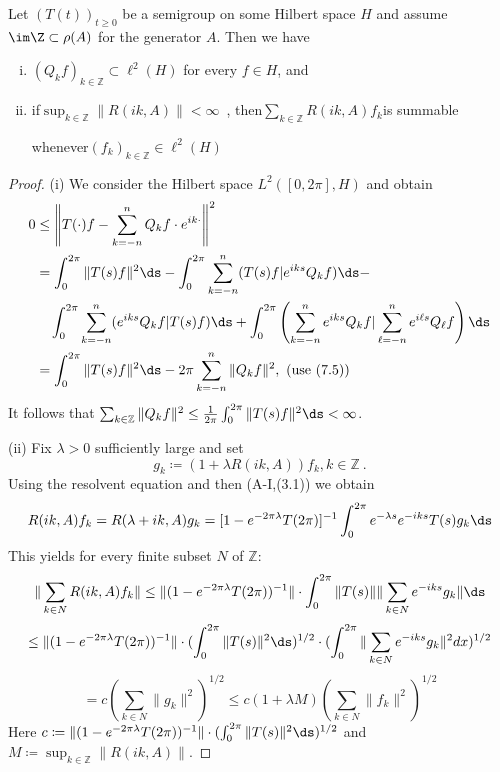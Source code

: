 \begin{lemma}\label{lem:a3-7.9}
Let $(T(t))_{t\geq 0}$ be a semigroup on some Hilbert space $H$ and assume $\im\Z \subset \rho(A)$ for the generator $A$.
Then we have



\begin{enumerate}[(i)]
\item 
$(Q_{k}f)_{k\in\mathbb{Z}} \subset \ell^{2}(H)$ for every $f \in H$, and

\item 
if\quad $\sup_{k\in\mathbb{Z}}\|R(ik,A)\| < \infty$~, then\quad $\sum_{k\in\mathbb{Z}} R(ik,A)f_{k}$\quad is summable 

whenever\quad $(f_{k})_{k\in\mathbb{Z}} \in \ell^{2}(H)$
\end{enumerate}
\end{lemma}

\begin{proof}
(i) We consider the Hilbert space $L^{2}([0,2\pi],H)$ and obtain
\begin{align*}
0 &\leq \left\|T(\cdot)f - \sum_{k=-n}^{n} Q_{k}f\cdot e^{ik\cdot}\right\|^{2} \\
&= \int_{0}^{2\pi} \|T(s)f\|^{2} \ds - \int_{0}^{2\pi} \sum_{k=-n}^{n} (T(s)f|e^{iks}Q_{k}f) \ds - \\
&\quad \int_{0}^{2\pi} \sum_{k=-n}^{n} (e^{iks}Q_{k}f|T(s)f) \ds + \int_{0}^{2\pi} \left(\sum_{k=-n}^{n} e^{iks}Q_{k}f|\sum_{\ell=-n}^{n} e^{i\ell s}Q_{\ell}f\right) \ds \\
&= \int_{0}^{2\pi} \|T(s)f\|^{2} \ds - 2\pi\sum_{k=-n}^{n} \|Q_{k}f\|^{2}, \text{ (use (7.5))}
\end{align*}
It follows that $\sum_{k\in\mathbb{Z}} \|Q_{k}f\|^{2} \leq \frac{1}{2\pi}\int_{0}^{2\pi} \|T(s)f\|^{2} \ds < \infty$.

(ii) Fix $\lambda > 0$ sufficiently large and set 
\[
g_{k}\coloneqq (1 + \lambda R(ik,A))f_{k}, k \in \mathbb{Z}~.
\]
Using the resolvent equation and then (A-I,(3.1)) we obtain
\[
R(ik,A)f_{k} = R(\lambda + ik,A)g_{k} = [1 - e^{-2\pi\lambda}T(2\pi)]^{-1}\int_{0}^{2\pi} e^{-\lambda s}e^{-iks}T(s)g_{k} \ds
\]
This yields for every finite subset $N$ of $\mathbb{Z}$:
\[
\|\sum_{k\in N} R(ik,A)f_{k}\| \leq \|(1 - e^{-2\pi\lambda}T(2\pi))^{-1}\|\cdot\int_{0}^{2\pi} \|T(s)\| \|\sum_{k\in N} e^{-iks}g_{k}\| \ds
\]
\[
\leq \|(1 - e^{-2\pi\lambda}T(2\pi))^{-1}\|\cdot(\int_{0}^{2\pi}\|T(s)\|^{2} \ds)^{1/2} \cdot (\int_{0}^{2\pi}\|\sum_{k\in N} e^{-iks}g_{k}\|^{2} dx)^{1/2}
\]
\[
= c(\sum_{k\in N} \|g_{k}\|^{2})^{1/2} \leq c(1 + \lambda M)(\sum_{k\in N} \|f_{k}\|^{2})^{1/2}
\]
Here $c\coloneqq \|(1 - e^{-2\pi\lambda}T(2\pi))^{-1}\|\cdot(\int_{0}^{2\pi}\|T(s)\|^{2} \ds)^{1/2}$ and $M\coloneqq \sup_{k\in\mathbb{Z}}\|R(ik,A)\|$.
\end{proof}

